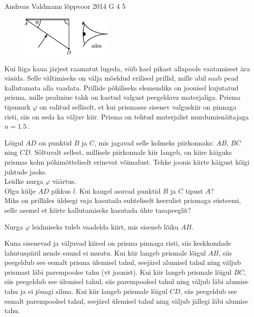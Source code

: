 {Andreas Valdmann} %
{lõppvoor} %
{2014} %
{G 4} %
{5} %
{
\ifStatement
\begin{figure}
  \begin{center}
    \includegraphics[width=0.4\textwidth]{2014-v3g-04-periskoopprillid_yl_joonis.pdf}
  \end{center}
\end{figure}

Kui liiga kaua järjest raamatut lugeda, võib kael pikast allapoole vaatamisest ära väsida. Selle vältimiseks on välja mõeldud erilised prillid, mille abil saab pead kallutamata alla vaadata. Prillide põhiliseks elemendiks on joonisel kujutatud prisma, mille pealmine tahk on kaetud valgust peegeldava materjaliga. Prisma tipunurk $\varphi$ on valitud selliselt, et kui prismasse sisenev valguskiir on pinnaga risti, siis on seda ka väljuv kiir. Prisma on tehtud materjalist murdumisnäitajaga $n=\SI{1,5}{}$. 

\osa Lõigul $AD$ on punktid $B$ ja $C$, mis jagavad selle kolmeks piirkonnaks: $AB$, $BC$ ning $CD$. Sõltuvalt sellest, millisele piirkonnale kiir langeb, on kiire käiguks prismas kolm põhimõtteliselt erinevat võimalust. Tehke joonis kiirte käigust kõigi juhtude jaoks.\\
\osa Leidke nurga $\varphi$ väärtus.\\
\osa Olgu külje $AD$ pikkus $l$. Kui kaugel asuvad punktid $B$ ja $C$ tipust $A$?\\
\osa Miks on prillides üldsegi vaja kasutada suhteliselt keerulist prismaga süsteemi, selle asemel et kiirte kallutamiseks kasutada ühte tasapeeglit?
\fi


\ifHint
Nurga $\varphi$ leidmiseks tuleb vaadelda kiirt, mis siseneb lõiku $AB$.
\fi


\ifSolution
\osa Kuna sisenevad ja väljuvad kiired on prisma pinnaga risti, siis keskkondade lahutuspiiril nende suund ei muutu. Kui kiir langeb prismale lõigul $AB$, siis peegeldub see esmalt prisma ülemisel tahul, seejärel alumisel tahul ning väljub prismast läbi parempoolse tahu (vt joonist). Kui kiir langeb prismale lõigul $BC$, siis peegeldub see ülemisel tahul, siis parempoolsel tahul ning väljub läbi alumise tahu ja ei jõuagi silma. Kui kiir langeb prismale lõigul $CD$, siis peegeldub see esmalt parempoolsel tahul, seejärel ülemisel tahul ning väljub jällegi läbi alumise tahu.

}

